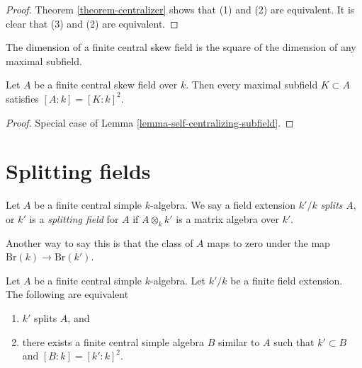 \begin{proof}
Theorem \ref{theorem-centralizer}
shows that (1) and (2) are equivalent.
It is clear that (3) and (2) are equivalent.
\end{proof}

\begin{lemma}
\label{lemma-maximal-subfield}
\begin{slogan}
The dimension of a finite central skew field is the square of the dimension
of any maximal subfield.
\end{slogan}
Let $A$ be a finite central skew field over $k$.
Then every maximal subfield $K \subset A$ satisfies
$[A : k] = [K : k]^2$.
\end{lemma}

\begin{proof}
Special case of Lemma \ref{lemma-self-centralizing-subfield}.
\end{proof}





\section{Splitting fields}
\label{section-splitting}


\begin{definition}
\label{definition-splitting}
Let $A$ be a finite central simple $k$-algebra.
We say a field extension $k'/k$ {\it splits} $A$, or
$k'$ is a {\it splitting field} for $A$ if $A \otimes_k k'$ is
a matrix algebra over $k'$.
\end{definition}

\noindent
Another way to say this is that the class of $A$ maps to zero
under the map $\text{Br}(k) \to \text{Br}(k')$.

\begin{theorem}
\label{theorem-splitting}
Let $A$ be a finite central simple $k$-algebra.
Let $k'/k$ be a finite field extension.
The following are equivalent
\begin{enumerate}
\item $k'$ splits $A$, and
\item there exists a finite central simple algebra $B$ similar to $A$
such that $k' \subset B$ and $[B : k] = [k' : k]^2$.
\end{enumerate}
\end{theorem}

